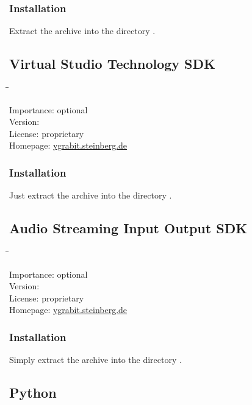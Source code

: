 \subsubsection{Installation}

Extract the archive into the directory .

\subsection{Virtual Studio Technology SDK}

\begin{tabbing}
  \hspace*{6em}\=\=\kill

  Importance:  \> optional \\
  Version:      \\
  License:     \> proprietary \\
  Homepage:    \> \href{http://ygrabit.steinberg.de/}{ygrabit.steinberg.de}
\end{tabbing}

\subsubsection{Installation}

Just extract the archive into the directory
.

\subsection{Audio Streaming Input Output SDK}

\begin{tabbing}
  \hspace*{6em}\=\=\kill

  Importance:  \> optional \\
  Version:      \\
  License:     \> proprietary \\
  Homepage:    \> \href{http://ygrabit.steinberg.de/}{ygrabit.steinberg.de}
\end{tabbing}

\subsubsection{Installation}

Simply extract the archive into the directory
.

\subsection{Python}

